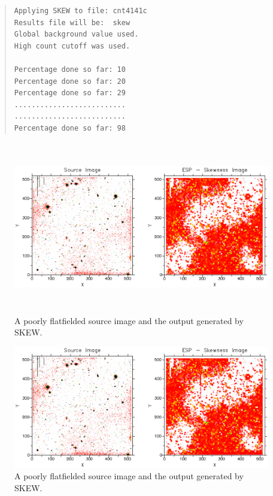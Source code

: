 \documentclass[twoside,11pt]{article}
\newenvironment{latexonly}{}{}
\newenvironment{myquote}{\begin{quote}\begin{small}}{\end{small}\end{quote}}
\begin{document}
\begin{myquote}
\begin{verbatim}
Applying SKEW to file: cnt4141c
Results file will be:  skew
Global background value used.
High count cutoff was used.
 
Percentage done so far: 10
Percentage done so far: 20
Percentage done so far: 29
..........................
..........................
Percentage done so far: 98
\end{verbatim}
\end{myquote}

\begin{latexonly}
\begin{figure}[htlb]
\centering 
\includegraphics[height=75mm,width=150mm]{sun180_diag6.eps}
\caption{A poorly flatfielded source image and the output generated by SKEW.}
\end{figure}
\end{latexonly}
\begin{htmlonly}
\begin{figure}[htlb]
\centering 
\includegraphics{sun180_diag6.eps}
\caption{A poorly flatfielded source image and the output generated by SKEW.}
\end{figure}
\end{htmlonly}
\end{document}
